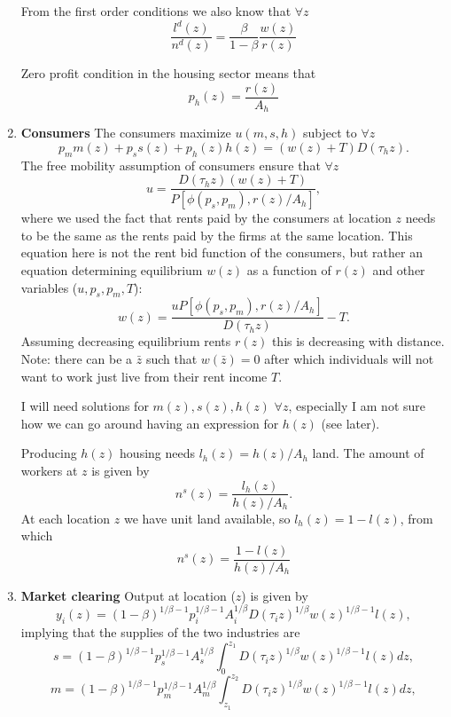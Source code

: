 \documentclass[10pt]{article}
\begin{document}
\begin{enumerate}
From the first order conditions we also know that $\forall z$
\begin{equation}
\frac{l^d(z)}{n^d(z)}=\frac{\beta}{1-\beta}\frac{w(z)}{r(z)}
\end{equation} 

Zero profit condition in the housing sector means that 
\begin{equation}
p_h(z)=\frac{r(z)}{A_h}
\end{equation}

\item \textbf{Consumers}
The consumers maximize $u(m,s,h)$ subject to $\forall z$
\begin{equation*}
p_mm(z)+p_ss(z)+p_h(z)h(z)=(w(z)+T)D(\tau_hz).
\end{equation*}
The free mobility assumption of consumers ensure that $\forall z$
\begin{equation}
u=\frac{D(\tau_hz)(w(z)+T)}{P\left[\phi(p_s,p_m),r(z)/A_h\right]},
\end{equation}
where we used the fact that rents paid by the consumers at location $z$ needs to be the same as the rents paid by the firms at the same location. This equation here is not the rent bid function of the consumers, but rather an equation determining equilibrium $w(z)$ as a function of $r(z)$ and other variables ($u, p_s, p_m,T$):
\begin{equation*}
w(z)=\frac{uP\left[\phi(p_s,p_m),r(z)/A_h\right]}{D(\tau_hz)}-T.
\end{equation*}
Assuming decreasing equilibrium rents $r(z)$ this is decreasing with distance. Note: there can be a $\bar{z}$ such that $w(\bar{z})=0$ after which individuals will not want to work just live from their rent income $T$.

I will need solutions for $m(z),s(z),h(z)$ $\forall z$, especially I am not sure how we can go around having an expression for $h(z)$ (see later).

Producing $h(z)$ housing needs $l_h(z)=h(z)/A_h$ land. The amount of workers at $z$ is given by 
\begin{equation*}
n^s(z)=\frac{l_h(z)}{h(z)/A_h}.
\end{equation*}
At each location $z$ we have unit land available, so $l_h(z)=1-l(z)$, from which
\begin{equation}
n^s(z)=\frac{1-l(z)}{h(z)/A_h}
\end{equation}  

\item \textbf{Market clearing}
Output at location ($z$) is given by 
\begin{equation*}
y_i(z)=(1-\beta)^{1/\beta-1}p_i^{1/\beta-1}A_i^{1/\beta}D(\tau_iz)^{1/\beta}w(z)^{1/\beta-1}l(z),
\end{equation*}
implying that the supplies of the two industries are
\begin{equation*}
s=(1-\beta)^{1/\beta-1}p_s^{1/\beta-1}A_s^{1/\beta}\int_0^{z_1}D(\tau_iz)^{1/\beta}w(z)^{1/\beta-1}l(z)dz,
\end{equation*}
\begin{equation*}
m=(1-\beta)^{1/\beta-1}p_m^{1/\beta-1}A_m^{1/\beta}\int_{z_1}^{z_2}D(\tau_iz)^{1/\beta}w(z)^{1/\beta-1}l(z)dz,
\end{equation*}


\end{enumerate}
\end{document}

